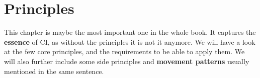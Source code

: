 \chapter{Principles}\label{ch:principles}


This chapter is maybe the most important one in the whole book.
It captures the \textbf{essence} of CI, as without the principles it is not it anymore.
We will have a look at the few core principles, and the requirements to be able to apply them.
We will also further include some side principles and \textbf{movement patterns} usually mentioned in the same sentence.







